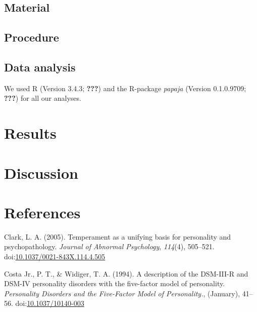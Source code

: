 \documentclass[man]{apa6}
\theoremstyle{definition}
\theoremstyle{definition}
\theoremstyle{definition}
\theoremstyle{remark}
\begin{document}
\hypertarget{material}{%
\subsection{Material}\label{material}}

\hypertarget{procedure}{%
\subsection{Procedure}\label{procedure}}

\hypertarget{data-analysis}{%
\subsection{Data analysis}\label{data-analysis}}

We used R (Version 3.4.3; {\textbf{???}}) and the R-package
\emph{papaja} (Version 0.1.0.9709; {\textbf{???}}) for all our analyses.

\hypertarget{results}{%
\section{Results}\label{results}}

\hypertarget{discussion}{%
\section{Discussion}\label{discussion}}

\newpage

\hypertarget{references}{%
\section{References}\label{references}}

\begingroup
\setlength{\parindent}{-0.5in}
\setlength{\leftskip}{0.5in}

\hypertarget{refs}{}
\leavevmode\hypertarget{ref-Clark2005}{}%
Clark, L. A. (2005). Temperament as a unifying basis for personality and
psychopathology. \emph{Journal of Abnormal Psychology}, \emph{114}(4),
505--521.
doi:\href{https://doi.org/10.1037/0021-843X.114.4.505}{10.1037/0021-843X.114.4.505}

\leavevmode\hypertarget{ref-Widiger1994}{}%
Costa Jr., P. T., \& Widiger, T. A. (1994). A description of the
DSM-III-R and DSM-IV personality disorders with the five-factor model of
personality. \emph{Personality Disorders and the Five-Factor Model of
Personality.}, (January), 41--56.
doi:\href{https://doi.org/10.1037/10140-003}{10.1037/10140-003}
\end{document}
